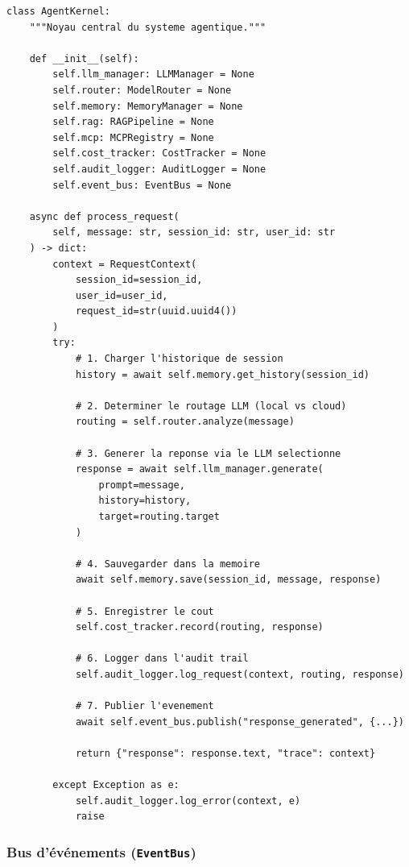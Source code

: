 \documentclass[12pt, a4paper]{article}
\begin{document}
\begin{lstlisting}[caption={Pipeline de traitement du kernel (simplifié)}, label={lst:kernel}]
class AgentKernel:
    """Noyau central du systeme agentique."""

    def __init__(self):
        self.llm_manager: LLMManager = None
        self.router: ModelRouter = None
        self.memory: MemoryManager = None
        self.rag: RAGPipeline = None
        self.mcp: MCPRegistry = None
        self.cost_tracker: CostTracker = None
        self.audit_logger: AuditLogger = None
        self.event_bus: EventBus = None

    async def process_request(
        self, message: str, session_id: str, user_id: str
    ) -> dict:
        context = RequestContext(
            session_id=session_id,
            user_id=user_id,
            request_id=str(uuid.uuid4())
        )
        try:
            # 1. Charger l'historique de session
            history = await self.memory.get_history(session_id)

            # 2. Determiner le routage LLM (local vs cloud)
            routing = self.router.analyze(message)

            # 3. Generer la reponse via le LLM selectionne
            response = await self.llm_manager.generate(
                prompt=message,
                history=history,
                target=routing.target
            )

            # 4. Sauvegarder dans la memoire
            await self.memory.save(session_id, message, response)

            # 5. Enregistrer le cout
            self.cost_tracker.record(routing, response)

            # 6. Logger dans l'audit trail
            self.audit_logger.log_request(context, routing, response)

            # 7. Publier l'evenement
            await self.event_bus.publish("response_generated", {...})

            return {"response": response.text, "trace": context}

        except Exception as e:
            self.audit_logger.log_error(context, e)
            raise
\end{lstlisting}

\subsubsection{Bus d'événements (\texttt{EventBus})}
\end{document}
